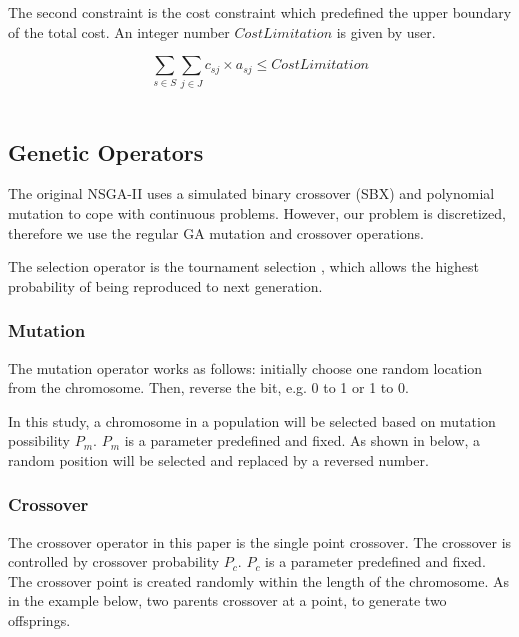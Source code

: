 \documentclass{llncs}
\begin{document}
The second constraint is the cost constraint which predefined the upper boundary of the total cost.
An integer number $CostLimitation$ is given by user.

{\centering
	\begin{equation}
		\sum\limits_{s \in S} \sum\limits_{j \in J} c_{sj} \times a_{sj} \leq CostLimitation
	\end{equation}
\\}


\subsection{Genetic Operators}
\label{sec:operators}
 The original NSGA-II uses a simulated 
binary crossover (SBX) \cite{930314} and polynomial mutation \cite{Raghuwanshi04} 
to cope with continuous problems. 
However, our problem is discretized, therefore we use the regular GA mutation and crossover operations.

The selection operator is the tournament selection \cite{Xie:2008:AMI:1389095.1389347}, which allows the highest probability 
of being reproduced to next generation.

\subsubsection{Mutation}
The mutation operator works as follows: initially choose one random location from the chromosome. 
Then, reverse the bit, e.g. 0 to 1 or 1 to 0. 

In this study, a chromosome in a population will be selected based on mutation possibility $P_{m}$. $P_{m}$ is 
a parameter predefined and fixed.
As shown in below, a random position will be selected and replaced by a reversed number.
\subsubsection{Crossover}
The crossover operator in this paper is the single point crossover. 
The crossover is controlled by crossover probability $P_{c}$. $P_{c}$ is a parameter predefined and fixed.
The crossover point is created randomly within the length of the chromosome. 
As in the example below, two parents crossover at a point, to generate two offsprings.
\end{document}
